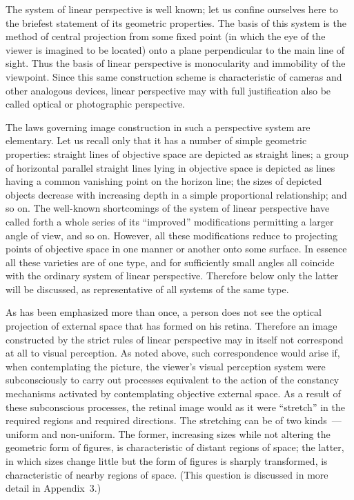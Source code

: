
The system of linear perspective is well known; let us confine ourselves here to the
briefest statement of its geometric properties.  The basis of this system is the method
of central projection from some fixed point (in which the eye of the viewer is imagined
to be located) onto a plane perpendicular to the main line of sight.  Thus the basis of
linear perspective is monocularity and immobility of the viewpoint.  Since this same
construction scheme is characteristic of cameras and other analogous devices, linear
perspective may with full justification also be called optical or photographic perspective.

The laws governing image construction in such a perspective system are elementary.
Let us recall only that it has a number of simple geometric properties: straight lines of
objective space are depicted as straight lines; a group of horizontal parallel straight
lines lying in objective space is depicted as lines having a common vanishing point on
the horizon line; the sizes of depicted objects decrease with increasing depth in a simple
proportional relationship; and so on.  The well-known shortcomings of the system of
linear perspective have called forth a whole series of its ``improved'' modifications
permitting a larger angle of view, and so on.  However, all these modifications reduce
to projecting points of objective space in one manner or another onto some surface.  In
essence all these varieties are of one type, and for sufficiently small angles all coincide
with the ordinary system of linear perspective.  Therefore below only the latter will be
discussed, as representative of all systems of the same type.

As has been emphasized more than once, a person does not see the optical projection of
external space that has formed on his retina.  Therefore an image constructed by the
strict rules of linear perspective may in itself not correspond at all to visual perception.
As noted above, such correspondence would arise if, when contemplating the picture, the
viewer's visual perception system were subconsciously to carry out processes equivalent
to the action of the constancy mechanisms activated by contemplating objective external
space.  As a result of these subconscious processes, the retinal image would as it were
``stretch'' in the required regions and required directions.  The stretching can be of two
kinds~--- uniform and non-uniform.  The former, increasing sizes while not altering the
geometric form of figures, is characteristic of distant regions of space; the latter, in
which sizes change little but the form of figures is sharply transformed, is characteristic
of nearby regions of space.  (This question is discussed in more detail in Appendix~3.)

